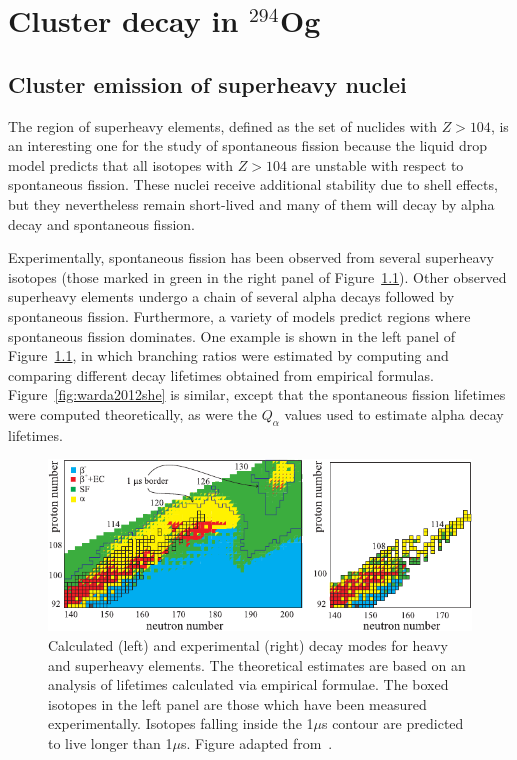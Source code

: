 \chapter{Cluster decay in $^{294}$Og}\label{chap:294Og}

\section{Cluster emission of superheavy nuclei}

The region of superheavy elements, defined as the set of nuclides with $Z>104$, is an interesting one for the study of spontaneous fission because the liquid drop model predicts that all isotopes with $Z>104$ are unstable with respect to spontaneous fission. These nuclei receive additional stability due to shell effects, but they nevertheless remain short-lived and many of them will decay by alpha decay and spontaneous fission.

Experimentally, spontaneous fission has been observed from several superheavy isotopes (those marked in green in the right panel of Figure~\ref{fig:karpovshedecay}). Other observed superheavy elements undergo a chain of several alpha decays followed by spontaneous fission. Furthermore, a variety of models predict regions where spontaneous fission dominates. One example is shown in the left panel of Figure~\ref{fig:karpovshedecay}, in which branching ratios were estimated by computing and comparing different decay lifetimes obtained from empirical formulas. Figure~\ref{fig:warda2012she} is similar, except that the spontaneous fission lifetimes were computed theoretically, as were the $Q_\alpha$ values used to estimate alpha decay lifetimes.


\begin{figure}
	\centering
	\includegraphics[width=0.9\linewidth]{TeX_files/294Og_Karpov_SHEdecay}
	\caption[Calculated (left) and experimental (right) decay modes for heavy and superheavy elements. The theoretical estimates are based on an analysis of lifetimes calculated via empirical formulae. The boxed isotopes in the left panel are those which have been measured experimentally. Isotopes falling inside the 1$\mu$s contour are predicted to live longer than 1$\mu$s. Figure adapted from~\cite{Karpova}.]{Calculated (left) and experimental (right) decay modes for heavy and superheavy elements. The theoretical estimates are based on an analysis of lifetimes calculated via empirical formulae. The boxed isotopes in the left panel are those which have been measured experimentally. Isotopes falling inside the 1$\mu$s contour are predicted to live longer than 1$\mu$s. Figure adapted from~\cite{Karpova}.}
	\label{fig:karpovshedecay}
\end{figure}



